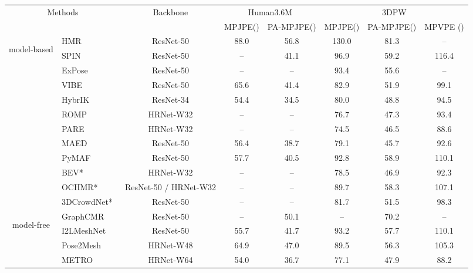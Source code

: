 \documentclass[10pt,twocolumn,letterpaper]{article}
\begin{document}
\begin{table*}[t]
\small
\centering
\begin{tabular}{c l c c c c c c}
\hline
\toprule
\multicolumn{2}{c}{\multirow{2}{*}[-0.7ex]{Methods}} & \multirow{2}{*}[-0.7ex]{Backbone} & \multicolumn{2}{c}{Human3.6M} & \multicolumn{3}{c}{3DPW}\\ \cmidrule(lr){4-5}\cmidrule(lr){6-8}
    & & & MPJPE() & PA-MPJPE() & MPJPE() & PA-MPJPE() & MPVPE ()\\ \midrule

\multirow{10}{*}[-3.0ex]{\begin{turn}{90}model-based\end{turn}}  & HMR~\cite{Kanazawa18} & ResNet-50 & 88.0 & 56.8 & 130.0 & 81.3 & --\\ 
& SPIN~\cite{Kolotouros19_ICCV} & ResNet-50 & -- & 41.1 & 96.9 & 59.2 & 116.4\\
& ExPose~\cite{Choutas20} & ResNet-50 & -- & -- &  93.4 & 55.6 & -- \\ 
& VIBE~\cite{Kocabas20} & ResNet-50 & 65.6 & 41.4 &  82.9 &  51.9 & 99.1\\
& HybrIK~\cite{Li21} & ResNet-34 &54.4 & 34.5 & 80.0 & 48.8 & 94.5\\
& ROMP~\cite{Sun21} & HRNet-W32 & -- & -- & 76.7 & 47.3 & 93.4\\
& PARE~\cite{Kocabas21} & HRNet-W32 & -- & -- & 74.5 & 46.5 & 88.6\\
& MAED~\cite{Wan21} & ResNet-50 & 56.4 & 38.7 & 79.1 & 45.7 & 92.6  \\
& PyMAF~\cite{Zhang21} & ResNet-50 & 57.7 & 40.5 & 92.8 & 58.9 & 110.1  \\
& BEV*~\cite{Sun22} & HRNet-W32 & -- & -- & 78.5 & 46.9 & 92.3\\
& OCHMR*~\cite{Khirodkar22} & ResNet-50 / HRNet-W32 & -- & -- & 89.7 & 58.3 & 107.1\\
& 3DCrowdNet*~\cite{Choi22} & ResNet-50 & -- & -- & 81.7 & 51.5 & 98.3\\
\midrule
\multirow{7}{*}[1.2ex]{\begin{turn}{90}model-free\end{turn}} & GraphCMR~\cite{Kolotouros19_CVPR} & ResNet-50 & -- & 50.1 & -- & 70.2 & --\\
&I2LMeshNet~\cite{Moon2020} & ResNet-50 & 55.7 & 41.7 & 93.2 & 57.7 & 110.1\\
&Pose2Mesh~\cite{Choi20} & HRNet-W48 & 64.9 & 47.0 & 89.5 & 56.3 & 105.3\\
&METRO~\cite{Lin21} & HRNet-W64 & 54.0 & 36.7 & 77.1 & 47.9 & 88.2\\

\end{tabular}
\end{table*}
\end{document}
